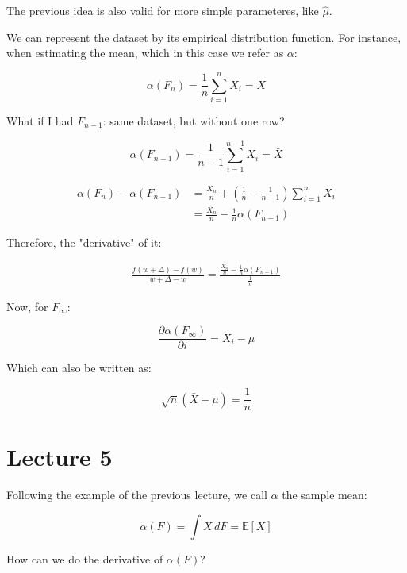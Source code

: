 \documentclass{article}
\begin{document}
The previous idea is also valid for more simple parameteres, like $\hat{\mu}$.

We can represent the dataset by its empirical distribution function. For instance, when estimating the mean, which in this case we refer as $\alpha$:

$$
\alpha(F_n) = \frac{1}{n} \sum_{i=1}^{n} X_i = \bar{X}
$$

What if I had $F_{n-1}$: same dataset, but without one row?


$$
\alpha(F_{n-1}) = \frac{1}{n-1} \sum_{i=1}^{n-1} X_i = \bar{X}
$$

\begin{align*}
    \alpha(F_n) - \alpha(F_{n-1}) &= \frac{X_n}{n} + \left(\frac{1}{n} - \frac{1}{n-1}\right) \sum_{i = 1}^n X_i \\
    &= \frac{X_n}{n} - \frac{1}{n} \alpha(F_{n-1})
\end{align*}

Therefore, the "derivative" of it:

\begin{align*}
    \frac{f(w+\Delta) - f(w)}{w+\Delta-w} = \frac{\frac{X_n}{n} - \frac{1}{n} \alpha(F_{n-1})}{\frac{1}{n}}
\end{align*}

Now, for $F_{\infty}$:

$$
\frac{\partial \alpha(F_{\infty})}{\partial i} = X_i - \mu
$$

Which can also be written as:

$$
\sqrt{n}(\bar{X} - \mu) = \frac{1}{n}
$$

\section{Lecture 5}
Following the example of the previous lecture, we call $\alpha$ the sample mean:

$$
\alpha(F) = \int X \,dF = \mathbb{E}[X]
$$

How can we do the derivative of $\alpha(F)$?
\end{document}
